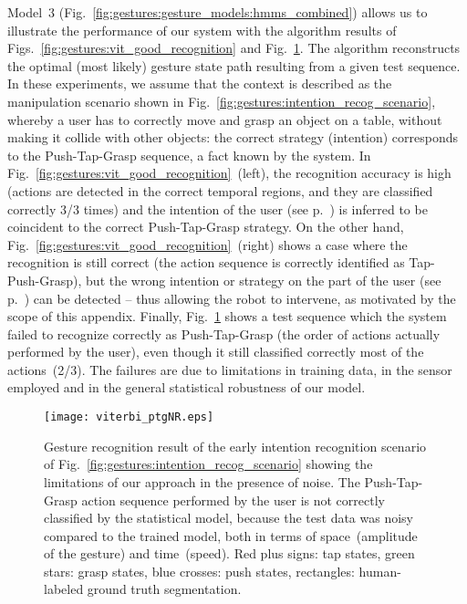 Model~3 (Fig.~\ref{fig:gestures:gesture_models:hmms_combined}) allows us to illustrate the performance of our system with the \Viterbi{} algorithm results of Figs.~\ref{fig:gestures:vit_good_recognition} and Fig.~\ref{fig:gestures:vit_bad_recognition}.
The algorithm reconstructs the optimal (most likely) gesture state path resulting from a given test sequence.
In these experiments, we assume that the context is described as the \hr{} manipulation scenario shown in Fig.~\ref{fig:gestures:intention_recog_scenario}, whereby a user has to correctly move and grasp an object on a table, without making it collide with other objects: the correct strategy (intention) corresponds to the Push-Tap-Grasp sequence, a fact known \apriori{} by the system.
In Fig.~\ref{fig:gestures:vit_good_recognition}~(left), the recognition accuracy is high (actions are detected in the correct temporal regions, and they are classified correctly 3/3 times) and the intention of the user (see p.~\pageref{intention_recognition}) is inferred to be coincident to the correct Push-Tap-Grasp strategy.
On the other hand, Fig.~\ref{fig:gestures:vit_good_recognition}~(right) shows a case where the recognition is still correct (the action sequence is correctly identified as Tap-Push-Grasp), but the wrong intention or strategy on the part of the user (see p.~\pageref{intention_recognition}) can be detected -- thus allowing the robot to intervene, as motivated by the scope of this appendix.
Finally, Fig.~\ref{fig:gestures:vit_bad_recognition} shows a test sequence which the system failed to recognize correctly as Push-Tap-Grasp (the order of actions actually performed by the user), even though it still classified correctly most of the actions~(2/3). The failures are due to limitations in training data, in the sensor employed and in the general statistical robustness of our model.

\begin{figure}
\texttt{[image: viterbi\_ptgNR.eps]}
\caption[Gesture recognition \Viterbi{} result of the early intention recognition scenario of Fig.~\ref{fig:gestures:intention_recog_scenario} showing the limitations of our approach in the presence of noise.]{Gesture recognition \Viterbi{} result of the early intention recognition scenario of Fig.~\ref{fig:gestures:intention_recog_scenario} showing the limitations of our approach in the presence of noise. The Push-Tap-Grasp action sequence performed by the user is not correctly classified by the statistical model, because the test data was noisy compared to the trained model, both in terms of space~(amplitude of the gesture) and time~(speed). Red plus signs: tap states, green stars: grasp states, blue crosses: push states, rectangles: human-labeled ground truth segmentation.}
\label{fig:gestures:vit_bad_recognition}
\end{figure}

